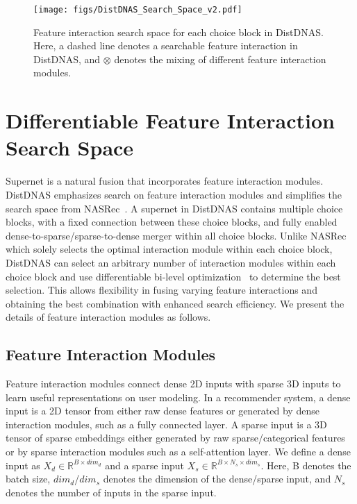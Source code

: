 \begin{figure*}[t]
    \begin{center}
    \texttt{[image: figs/DistDNAS\_Search\_Space\_v2.pdf]}
    \vspace{-1em}
    \caption{Feature interaction search space for each choice block in DistDNAS. Here, a dashed line denotes a searchable feature interaction in DistDNAS, and $\otimes$ denotes the mixing of different feature interaction modules.}
    \label{fig:dnas_search_space}
    \end{center}
    \vspace{-1em}
\end{figure*}

\section{Differentiable Feature Interaction Search Space}
Supernet is a natural fusion that incorporates feature interaction modules. DistDNAS emphasizes search on feature interaction modules and simplifies the search space from NASRec~\cite{zhang2022nasrec}. 
A supernet in DistDNAS contains multiple choice blocks, with a fixed connection between these choice blocks, and fully enabled dense-to-sparse/sparse-to-dense merger within all choice blocks. 
Unlike NASRec~\cite{zhang2022nasrec} which solely selects the optimal interaction module within each choice block, DistDNAS can select an arbitrary number of interaction modules within each choice block and use differentiable bi-level optimization~\cite{liu2018darts} to determine the best selection.
This allows flexibility in fusing varying feature interactions and obtaining the best combination with enhanced search efficiency.
We present the details of feature interaction modules as follows.


\subsection{Feature Interaction Modules}
Feature interaction modules connect dense 2D inputs with sparse 3D inputs to learn useful representations on user modeling.
In a recommender system, a dense input is a 2D tensor from either raw dense features or generated by dense interaction modules, such as a fully connected layer.
A sparse input is a 3D tensor of sparse embeddings either generated by raw sparse/categorical features or by sparse interaction modules such as a self-attention layer.
We define a dense input as $X_{d} \in \mathbb{R}^{B \times dim_d}$ and a sparse input $X_{s} \in \mathbb{R}^{B \times N_s \times dim_s}$. 
Here, B denotes the batch size, $dim_d$/$dim_s$ denotes the dimension of the dense/sparse input, and $N_s$ denotes the number of inputs in the sparse input.

